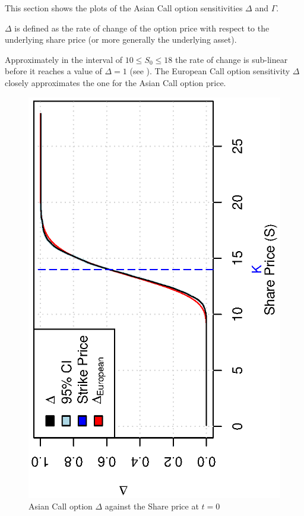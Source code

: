 \documentclass[12pt,a4paper]{article}
\begin{document}
This section shows the plots of the Asian Call option sensitivities
$\Delta$ and $\Gamma$.

$\Delta$ is defined as the rate of change of the option price with
respect to the underlying share price (or more generally the
underlying asset).

Approximately in the interval of $10 \leq S_{0} \le 18$ the rate of
change is sub-linear before it reaches a value of $\Delta=1$ (see
). The European Call option sensitivity
$\Delta$ closely approximates the one for the Asian Call option price.

\begin{figure}[!ht]
  \centering
  \includegraphics[scale=0.85,angle=-90]{./images/pseudo/delta_share.eps}
  \caption{Asian Call option $\Delta$ against the Share price at $t=0$}
  \label{fig:delta-share}
\end{figure}
\end{document}
